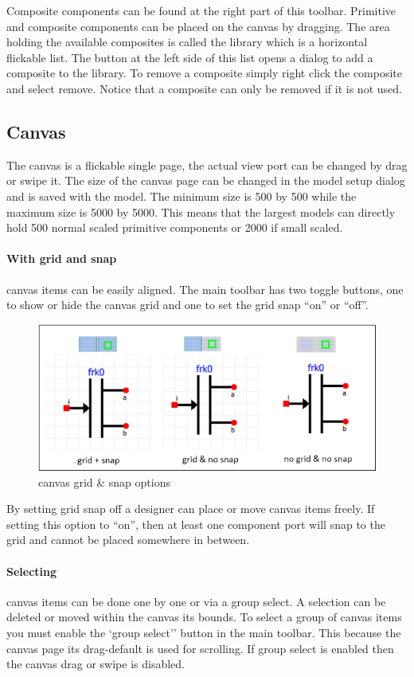 Composite components can be found at the right part of this toolbar. Primitive
and composite components can be placed on the canvas by dragging. The area
holding the available composites is called the library which is a horizontal
flickable list. The button at the left side of this list opens a dialog to add a
composite to the library. To remove a composite simply right click the composite
and select remove. Notice that a composite can only be removed if it is not
used.


\subsection{Canvas}
The canvas is a flickable single page, the actual view port can be changed by
drag or swipe it. The size of the canvas page can be changed in the model setup
dialog and is saved with the model. The minimum size is 500 by 500 while the
maximum size is 5000 by 5000. This means that the largest models can directly
hold 500 normal scaled primitive components or 2000 if small scaled.

\paragraph{With grid and snap}canvas items can be easily aligned. The main
toolbar has two toggle buttons, one to show or hide the canvas grid and one to
set the grid snap ``on'' or ``off''. 

\begin{figure}[here]
\begin{center}	
	\includegraphics[width=.70\linewidth]{pictures/canvas-grid}
	\caption{canvas grid \& snap options}
	\label{fig:canvas-grid}
\end{center}
\end{figure}

By setting grid snap off a designer can place or move canvas items freely. If
setting this option to ``on'', then at least one component port will snap to the
grid and cannot be placed somewhere in between.

\paragraph{Selecting}canvas items can be done one by one or via a group select.
A selection can be deleted or moved within the canvas its bounds. To select a
group of canvas items you must enable the `group select'' button in the main
toolbar. This because the canvas page its drag-default is used for scrolling.
If group select is enabled then the canvas drag or swipe is disabled.

